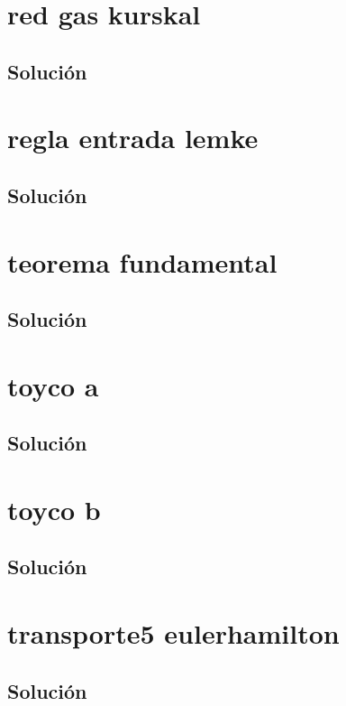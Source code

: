 \documentclass[a4paper,10pt,onecolumn]{report}
\begin{document}
\section{red gas kurskal}

\subsection*{Solución}

\clearpage
\section{regla entrada lemke}

\subsection*{Solución}

\clearpage
\section{teorema fundamental}

\subsection*{Solución}

\clearpage
\section{toyco a}

\subsection*{Solución}

\clearpage
\section{toyco b}

\subsection*{Solución}

\clearpage
\section{transporte5 eulerhamilton}

\subsection*{Solución}

\clearpage
\end{document}
